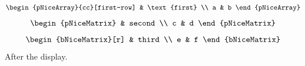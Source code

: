 \documentclass{article}
\begin{document}
\begin{align}
\begin{pNiceArray}{cc}[first-row]
 & \text{first} \\
 a & b
\end{pNiceArray}
\end{align}
\begin{align}
\begin{pNiceMatrix}
 & second \\
 c & d
\end{pNiceMatrix}
\end{align}
\begin{align}
\begin{bNiceMatrix}[r]
 & third \\
 e & f
\end{bNiceMatrix}
\end{align}
After the display.
\end{document}

